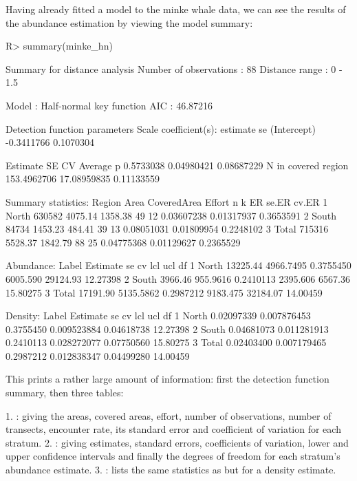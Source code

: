 \documentclass[article]{jss}
\begin{document}
Having already fitted a model to the minke whale data, we can see the results of the abundance estimation by viewing the model summary:
\begin{Schunk}
\begin{Sinput}
R> summary(minke_hn)
\end{Sinput}
\begin{Soutput}
Summary for distance analysis 
Number of observations :  88 
Distance range         :  0  -  1.5 

Model : Half-normal key function 
AIC   : 46.87216 

Detection function parameters
Scale coefficient(s):  
              estimate        se
(Intercept) -0.3411766 0.1070304

                       Estimate          SE         CV
Average p             0.5733038  0.04980421 0.08687229
N in covered region 153.4962706 17.08959835 0.11133559

Summary statistics:
  Region   Area CoveredArea  Effort  n  k         ER      se.ER     cv.ER
1  North 630582     4075.14 1358.38 49 12 0.03607238 0.01317937 0.3653591
2  South  84734     1453.23  484.41 39 13 0.08051031 0.01809954 0.2248102
3  Total 715316     5528.37 1842.79 88 25 0.04775368 0.01129627 0.2365529

Abundance:
  Label Estimate        se        cv      lcl      ucl       df
1 North 13225.44 4966.7495 0.3755450 6005.590 29124.93 12.27398
2 South  3966.46  955.9616 0.2410113 2395.606  6567.36 15.80275
3 Total 17191.90 5135.5862 0.2987212 9183.475 32184.07 14.00459

Density:
  Label   Estimate          se        cv         lcl        ucl       df
1 North 0.02097339 0.007876453 0.3755450 0.009523884 0.04618738 12.27398
2 South 0.04681073 0.011281913 0.2410113 0.028272077 0.07750560 15.80275
3 Total 0.02403400 0.007179465 0.2987212 0.012838347 0.04499280 14.00459
\end{Soutput}
\end{Schunk}
This prints a rather large amount of information: first the detection function summary, then three tables:

1. : giving the areas, covered areas, effort, number of observations, number of transects, encounter rate, its standard error and coefficient of variation for each stratum. 
2. : giving estimates, standard errors, coefficients of variation, lower and upper confidence intervals and finally the degrees of freedom for each stratum's abundance estimate.
3. : lists the same statistics as  but for a density estimate.
\end{document}
